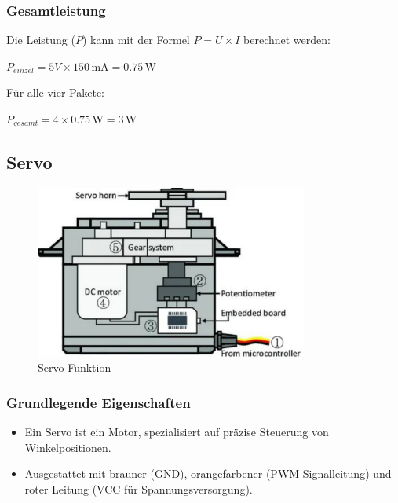 \documentclass{vorlage-design-main}
\begin{document}
\hypertarget{gesamtleistung}{%
\subsubsection{Gesamtleistung}\label{gesamtleistung}}

Die Leistung ($P$) kann mit der Formel $P = U \times I$ berechnet
werden:

$P_{einzel} = 5V \times 150\, \text{mA} = 0.75\, \text{W}$

Für alle vier Pakete:

$P_{gesamt} = 4 \times 0.75\, \text{W} = 3\, \text{W}$

\hypertarget{servo}{%
\subsection{Servo}\label{servo}}

\begin{figure}
\centering
\includegraphics[width=0.8\textwidth]{images/servo_internal.pdf}
\floatnotes{}
\caption{Servo Funktion}
\end{figure}

\hypertarget{grundlegende-eigenschaften}{%
\subsubsection{Grundlegende
Eigenschaften}\label{grundlegende-eigenschaften}}

\begin{itemize}

\item
  Ein Servo ist ein Motor, spezialisiert auf präzise Steuerung von
  Winkelpositionen.
\item
  Ausgestattet mit brauner (GND), orangefarbener (PWM-Signalleitung) und
  roter Leitung (VCC für Spannungsversorgung).
\end{itemize}
\end{document}
